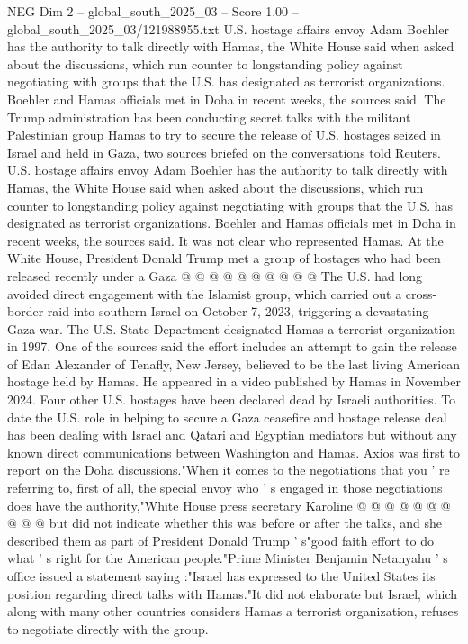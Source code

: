 \begin{textsample}{NEG Dim 2 – global\_south\_2025\_03 – Score 1.00 – global\_south\_2025\_03/121988955.txt}  \label{ex:f2_neg_146}
U.S. hostage affairs envoy Adam Boehler has the authority to talk directly with Hamas, the White House said when asked about the discussions, which run counter to longstanding policy against negotiating with groups that the U.S. has designated as terrorist organizations.
Boehler and Hamas officials met in Doha in recent weeks, the sources said.
The Trump administration has been conducting secret talks with the militant Palestinian group Hamas to try to secure the release of U.S. hostages seized in Israel and held in Gaza, two sources briefed on the conversations told Reuters.
U.S. hostage affairs envoy Adam Boehler has the authority to talk directly with Hamas, the White House said when asked about the discussions, which run counter to longstanding policy against negotiating with groups that the U.S. has designated as terrorist organizations.
Boehler and Hamas officials met in Doha in recent weeks, the sources said.
It was not clear who represented Hamas.
At the White House, President Donald Trump met a group of hostages who had been released recently under a Gaza @ @ @ @ @ @ @ @ @ @ The U.S. had long avoided direct engagement with the Islamist group, which carried out a cross-border raid into southern Israel on October 7, 2023, triggering a devastating Gaza war.
The U.S.
State Department designated Hamas a terrorist organization in 1997.
One of the sources said the effort includes an attempt to gain the release of Edan Alexander of Tenafly, New Jersey, believed to be the last living American hostage held by Hamas.
He appeared in a video published by Hamas in November 2024.
Four other U.S. hostages have been declared dead by Israeli authorities.
To date the U.S. role in helping to secure a Gaza ceasefire and hostage release deal has been dealing with Israel and Qatari and Egyptian mediators but without any known direct communications between Washington and Hamas.
Axios was first to report on the Doha discussions."When it comes to the negotiations that you ' re referring to, first of all, the special envoy who ' s engaged in those negotiations does have the authority,"White House press secretary Karoline @ @ @ @ @ @ @ @ @ @ but did not indicate whether this was before or after the talks, and she described them as part of President Donald Trump ' s"good faith effort to do what ' s right for the American people."Prime Minister Benjamin Netanyahu ' s office issued a statement saying :"Israel has expressed to the United States its position regarding direct talks with Hamas."It did not elaborate but Israel, which along with many other countries considers Hamas a terrorist organization, refuses to negotiate directly with the group.

\end{textsample}
